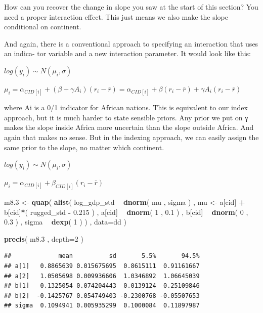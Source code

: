 \documentclass[
]{article}
\newenvironment{Shaded}{\begin{snugshade}}{\end{snugshade}}
\newcommand{\DataTypeTok}[1]{\textcolor[rgb]{0.13,0.29,0.53}{#1}}
\newcommand{\DecValTok}[1]{\textcolor[rgb]{0.00,0.00,0.81}{#1}}
\newcommand{\FloatTok}[1]{\textcolor[rgb]{0.00,0.00,0.81}{#1}}
\newcommand{\KeywordTok}[1]{\textcolor[rgb]{0.13,0.29,0.53}{\textbf{#1}}}
\newcommand{\NormalTok}[1]{#1}
\newcommand{\OperatorTok}[1]{\textcolor[rgb]{0.81,0.36,0.00}{\textbf{#1}}}
\newcommand{\StringTok}[1]{\textcolor[rgb]{0.31,0.60,0.02}{#1}}
\begin{document}
How can you recover the change in slope you saw at the start of this
section? You need a proper interaction effect. This just means we also
make the slope conditional on continent.

And again, there is a conventional approach to specifying an interaction
that uses an indica- tor variable and a new interaction parameter. It
would look like this:

\(log(y_i) \sim N(\mu_i, \sigma)\)

\(\mu_i = \alpha_{CID[i]} + (\beta + \gamma A_i) (r_i - \bar{r})= \alpha_{CID[i]} +\beta(r_i - \bar{r})+ \gamma A_i(r_i - \bar{r})\)

where Ai is a 0/1 indicator for African nations. This is equivalent to
our index approach, but it is much harder to state sensible priors. Any
prior we put on γ makes the slope inside Africa more uncertain than the
slope outside Africa. And again that makes no sense. But in the indexing
approach, we can easily assign the same prior to the slope, no matter
which continent.

\(log(y_i) \sim N(\mu_i, \sigma)\)

\(\mu_i = \alpha_{CID[i]} + \beta_{CID[i]}(r_i - \bar{r})\)

\begin{Shaded}
\begin{Highlighting}[]
\NormalTok{m8}\FloatTok{.3}\NormalTok{ <-}\StringTok{ }\KeywordTok{quap}\NormalTok{(}
    \KeywordTok{alist}\NormalTok{(}
\NormalTok{        log_gdp_std }\OperatorTok{~}\StringTok{ }\KeywordTok{dnorm}\NormalTok{( mu , sigma ) ,}
\NormalTok{        mu <-}\StringTok{ }\NormalTok{a[cid] }\OperatorTok{+}\StringTok{ }\NormalTok{b[cid]}\OperatorTok{*}\NormalTok{( rugged_std }\OperatorTok{-}\StringTok{ }\FloatTok{0.215}\NormalTok{ ) ,}
\NormalTok{        a[cid] }\OperatorTok{~}\StringTok{ }\KeywordTok{dnorm}\NormalTok{( }\DecValTok{1}\NormalTok{ , }\FloatTok{0.1}\NormalTok{ ) ,}
\NormalTok{        b[cid] }\OperatorTok{~}\StringTok{ }\KeywordTok{dnorm}\NormalTok{( }\DecValTok{0}\NormalTok{ , }\FloatTok{0.3}\NormalTok{ ) ,}
\NormalTok{        sigma }\OperatorTok{~}\StringTok{ }\KeywordTok{dexp}\NormalTok{( }\DecValTok{1}\NormalTok{ )}
\NormalTok{) , }\DataTypeTok{data=}\NormalTok{dd )}

\KeywordTok{precis}\NormalTok{( m8}\FloatTok{.3}\NormalTok{ , }\DataTypeTok{depth=}\DecValTok{2}\NormalTok{ )}
\end{Highlighting}
\end{Shaded}

\begin{verbatim}
##             mean          sd       5.5%       94.5%
## a[1]   0.8865639 0.015675695  0.8615111  0.91161667
## a[2]   1.0505698 0.009936606  1.0346892  1.06645039
## b[1]   0.1325054 0.074204443  0.0139124  0.25109846
## b[2]  -0.1425767 0.054749403 -0.2300768 -0.05507653
## sigma  0.1094941 0.005935299  0.1000084  0.11897987
\end{verbatim}
\end{document}
